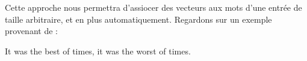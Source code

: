 \documentclass[11pt, a4paper]{report}
\begin{document}
Cette approche nous permettra d'assiocer des vecteurs aux mots d'une entrée de taille 
arbitraire, et en plus automatiquement. Regardons sur un exemple provenant de \cite{understanding-word-vectors} :
\begin{center}
  It was the best of times, it was the worst of times.                                                                                                                                                                                                                                                                                                                                                                                                                                                                                                                                                                                                                                                                                                                                                                                                                                                                                                                                                                                                                                                                                                                                                                                                                                                                                                                                                                                                                                                                                                                                                                                                                                                                                                                                                                                                                                                                                                                                                                                                                                                                                                                                                                                                                                                                                                                                                                                                                                                                                                                                                                                                                                                                                                                                                                                                                                                                                                                                                                                                                                                                                                                          
\end{center}
\end{document}

